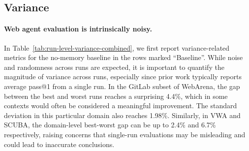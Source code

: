 \documentclass{article}
\begin{document}
\subsection{Variance}
\label{ssec:variance}

\paragraph{Web agent evaluation is intrinsically noisy.}
In Table~\ref{tab:run-level-variance-combined}, we first report variance-related metrics for the no-memory baseline in the rows marked ``Baseline''. While noise and randomness across runs are expected, it is important to quantify the magnitude of variance across runs, especially since prior work typically reports average pass@1 from a single run. In the GitLab subset of WebArena, the gap between the best and worst runs reaches a surprising 4.4\%, which in some contexts would often be considered a meaningful improvement. The standard deviation in this particular domain also reaches 1.98\%. Similarly, in VWA and SCUBA, the domain-level best-worst gap can be up to 2.4\% and 6.7\% respectively, raising concerns that single-run evaluations may be misleading and could lead to inaccurate conclusions.
\end{document}
